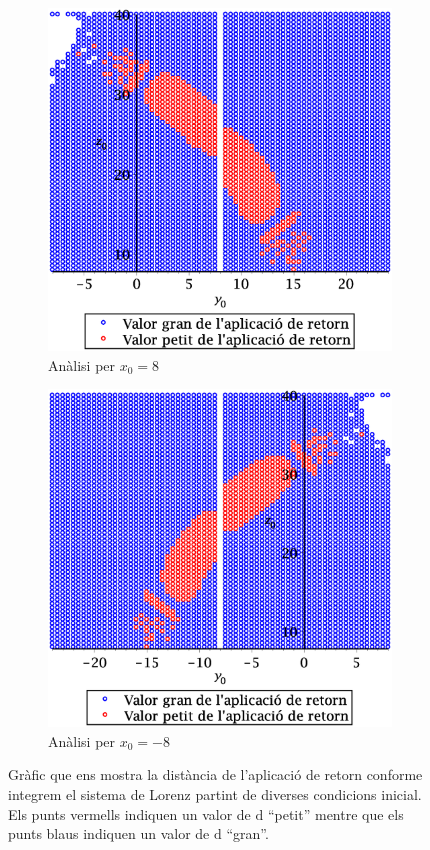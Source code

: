 \documentclass[a4paper]{article}
\newcommand{\vf}[1]{\boldsymbol{\mathrm{#1}}} %
\theoremstyle{definition}
\begin{document}
\begin{figure}[ht]
  \centering
  \begin{subfigure}[b]{0.45\linewidth}
    \centering
    \includegraphics[width=\linewidth]{Images/ex3-8vb.eps}
    \caption{Anàlisi per $x_0 = 8$}
  \end{subfigure}
  \hfill
  \begin{subfigure}[b]{0.45\linewidth}
    \centering
    \includegraphics[width=\linewidth]{Images/ex3--8vb.eps}
    \caption{Anàlisi per $x_0 = - 8$}
  \end{subfigure}
  \caption{Gràfic que ens mostra la distància de l'aplicació de retorn conforme integrem el sistema de Lorenz partint de diverses condicions inicial. Els punts vermells indiquen un valor de $\vf{d}$ ``petit'' mentre que els punts blaus indiquen un valor de $\vf{d}$ ``gran''. }
\end{figure}
\end{document}
